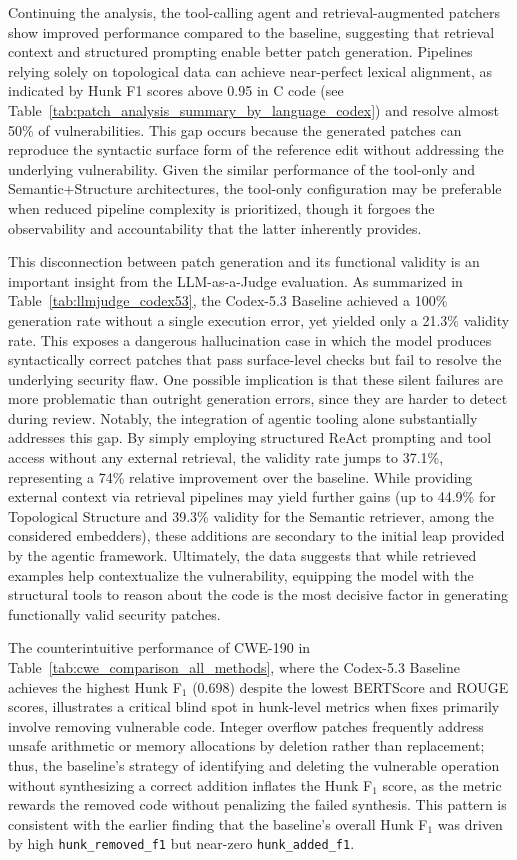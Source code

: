 Continuing the analysis, the tool-calling agent and retrieval-augmented patchers show improved performance compared to the baseline, suggesting that retrieval context and structured prompting enable better patch generation.
Pipelines relying solely on topological data can achieve near-perfect lexical alignment, as indicated by Hunk F1 scores above 0.95 in C code (see Table~\ref{tab:patch_analysis_summary_by_language_codex}) and resolve almost 50\% of vulnerabilities. 
This gap occurs because the generated patches can reproduce the syntactic surface form of the reference edit without addressing the underlying vulnerability.
Given the similar performance of the tool-only and Semantic+Structure architectures, the tool-only configuration may be preferable when reduced pipeline complexity is prioritized, though it forgoes the observability and accountability that the latter inherently provides.

This disconnection between patch generation and its functional validity is an important insight from the LLM-as-a-Judge evaluation. 
As summarized in Table~\ref{tab:llmjudge_codex53}, the Codex-5.3 Baseline achieved a 100\% generation rate without a single execution error, yet yielded only a 21.3\% validity rate. 
This exposes a dangerous hallucination case in which the model produces syntactically correct patches that pass surface-level checks but fail to resolve the underlying security flaw. One possible implication is that these silent failures are more problematic than outright generation errors, since they are harder to detect during review. 
Notably, the integration of agentic tooling alone substantially addresses this gap.
By simply employing structured ReAct prompting and tool access without any external retrieval, the validity rate jumps to 37.1\%, representing a 74\% relative improvement over the baseline. 
While providing external context via retrieval pipelines may yield further gains (up to 44.9\% for Topological Structure and 39.3\% validity for the Semantic retriever, among the considered embedders), these additions are secondary to the initial leap provided by the agentic framework. 
Ultimately, the data suggests that while retrieved examples help contextualize the vulnerability, equipping the model with the structural tools to reason about the code is the most decisive factor in generating functionally valid security patches.

The counterintuitive performance of CWE-190 in Table~\ref{tab:cwe_comparison_all_methods}, where the Codex-5.3 Baseline achieves the highest Hunk F$_1$ (0.698) despite the lowest BERTScore and ROUGE scores, illustrates a critical blind spot in hunk-level metrics when fixes primarily involve removing vulnerable code. Integer overflow patches frequently address unsafe arithmetic or memory allocations by deletion rather than replacement; thus, the baseline's strategy of identifying and deleting the vulnerable operation without synthesizing a correct addition inflates the Hunk F$_1$ score, as the metric rewards the removed code without penalizing the failed synthesis. This pattern is consistent with the earlier finding that the baseline's overall Hunk F$_1$ was driven by high \texttt{hunk\_removed\_f1} but near-zero \texttt{hunk\_added\_f1}.

